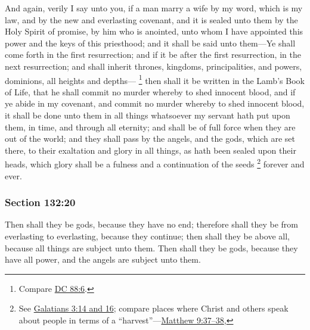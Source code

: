 		And again, verily I say unto you, if a man marry a wife by my word, which is my law, and by the new and everlasting covenant, and it is sealed unto them by the Holy Spirit of promise, by him who is anointed, unto whom I have appointed this power and the keys of this priesthood; and it shall be said unto them---Ye shall come forth in the first resurrection; and if it be after the first resurrection, in the next resurrection; and shall inherit thrones, kingdoms, principalities, and powers, dominions, all heights and depths---%
			\footnote{%
				Compare \hyperref[DC88-6]{DC 88:6}.
				}%
		then shall it be written in the Lamb's Book of Life, that he shall commit no murder whereby to shed innocent blood, and if ye abide in my covenant, and commit no murder whereby to shed innocent blood, it shall be done unto them in all things whatsoever my servant hath put upon them, in time, and through all eternity; and shall be of full force when they are out of the world; and they shall pass by the angels, and the gods, which are set there, to their exaltation and glory in all things, as hath been sealed upon their heads, which glory shall be a fulness and a continuation of the seeds%
			\footnote{%
				See \hyperref[GALATIANS-3-14]{Galatians 3:14 and 16}; compare places where Christ and others speak about people in terms of a ``harvest''---\hyperref[MATTHEW-9-37]{Matthew 9:37--38}, 
				} 
		forever and ever.


	\subsubsection{Section 132:20} %
		\label{DC132-20}

		Then shall they be gods, because they have no end; therefore shall they be from everlasting to everlasting, because they continue; then shall they be above all, because all things are subject unto them. Then shall they be gods, because they have all power, and the angels are subject unto them.


